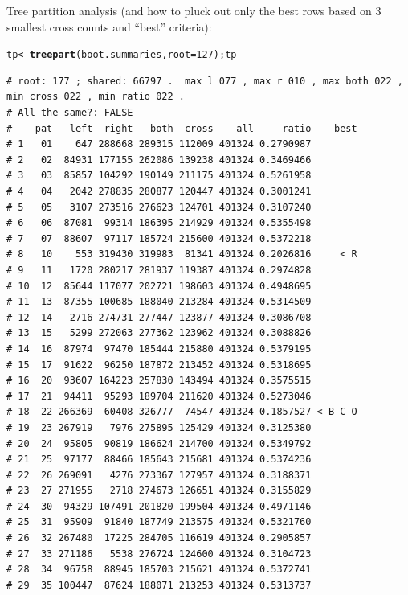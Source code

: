 \documentclass{article}\usepackage[]{graphicx}\usepackage[]{color}
\makeatletter
\newcommand{\hlnum}[1]{\textcolor[rgb]{0.686,0.059,0.569}{#1}}%
\newcommand{\hlstd}[1]{\textcolor[rgb]{0.345,0.345,0.345}{#1}}%
\newcommand{\hlkwb}[1]{\textcolor[rgb]{0.69,0.353,0.396}{#1}}%
\newcommand{\hlkwc}[1]{\textcolor[rgb]{0.333,0.667,0.333}{#1}}%
\newcommand{\hlkwd}[1]{\textcolor[rgb]{0.737,0.353,0.396}{\textbf{#1}}}%
\newenvironment{kframe}{%
 \def\at@end@of@kframe{}%
 \ifinner\ifhmode%
  \def\at@end@of@kframe{\end{minipage}}%
  \begin{minipage}{\columnwidth}%
 \fi\fi%
 \def\FrameCommand##1{\hskip\@totalleftmargin \hskip-\fboxsep
 \colorbox{shadecolor}{##1}\hskip-\fboxsep
     \hskip-\linewidth \hskip-\@totalleftmargin \hskip\columnwidth}%
 \MakeFramed {\advance\hsize-\width
   \@totalleftmargin\z@ \linewidth\hsize
   \@setminipage}}%
 {\par\unskip\endMakeFramed%
 \at@end@of@kframe}
\newenvironment{knitrout}{}{} %
\makeatother
\begin{document}
Tree partition analysis (and how to pluck out only the best rows based on 3 smallest cross counts and ``best'' criteria):

\begin{knitrout}\scriptsize
{}\color{fgcolor}\begin{kframe}
\begin{alltt}
\hlstd{tp} \hlkwb{<-} \hlkwd{treepart}\hlstd{(boot.summaries,}\hlkwc{root}\hlstd{=}\hlnum{127}\hlstd{) ; tp}
\end{alltt}
\begin{verbatim}
# root: 177 ; shared: 66797 .  max l 077 , max r 010 , max both 022 , min cross 022 , min ratio 022 . 
# All the same?: FALSE
#    pat   left  right   both  cross    all     ratio    best
# 1   01    647 288668 289315 112009 401324 0.2790987        
# 2   02  84931 177155 262086 139238 401324 0.3469466        
# 3   03  85857 104292 190149 211175 401324 0.5261958        
# 4   04   2042 278835 280877 120447 401324 0.3001241        
# 5   05   3107 273516 276623 124701 401324 0.3107240        
# 6   06  87081  99314 186395 214929 401324 0.5355498        
# 7   07  88607  97117 185724 215600 401324 0.5372218        
# 8   10    553 319430 319983  81341 401324 0.2026816     < R
# 9   11   1720 280217 281937 119387 401324 0.2974828        
# 10  12  85644 117077 202721 198603 401324 0.4948695        
# 11  13  87355 100685 188040 213284 401324 0.5314509        
# 12  14   2716 274731 277447 123877 401324 0.3086708        
# 13  15   5299 272063 277362 123962 401324 0.3088826        
# 14  16  87974  97470 185444 215880 401324 0.5379195        
# 15  17  91622  96250 187872 213452 401324 0.5318695        
# 16  20  93607 164223 257830 143494 401324 0.3575515        
# 17  21  94411  95293 189704 211620 401324 0.5273046        
# 18  22 266369  60408 326777  74547 401324 0.1857527 < B C O
# 19  23 267919   7976 275895 125429 401324 0.3125380        
# 20  24  95805  90819 186624 214700 401324 0.5349792        
# 21  25  97177  88466 185643 215681 401324 0.5374236        
# 22  26 269091   4276 273367 127957 401324 0.3188371        
# 23  27 271955   2718 274673 126651 401324 0.3155829        
# 24  30  94329 107491 201820 199504 401324 0.4971146        
# 25  31  95909  91840 187749 213575 401324 0.5321760        
# 26  32 267480  17225 284705 116619 401324 0.2905857        
# 27  33 271186   5538 276724 124600 401324 0.3104723        
# 28  34  96758  88945 185703 215621 401324 0.5372741        
# 29  35 100447  87624 188071 213253 401324 0.5313737        

\end{verbatim}
\end{kframe}
\end{knitrout}
\end{document}
